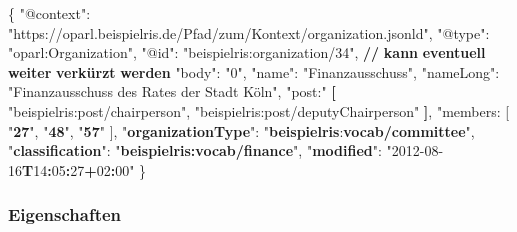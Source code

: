 \documentclass[,a4paper]{article}
\newenvironment{Shaded}{}{}
\newcommand{\DataTypeTok}[1]{\textcolor[rgb]{0.56,0.13,0.00}{{#1}}}
\newcommand{\DecValTok}[1]{\textcolor[rgb]{0.25,0.63,0.44}{{#1}}}
\newcommand{\StringTok}[1]{\textcolor[rgb]{0.25,0.44,0.63}{{#1}}}
\newcommand{\ErrorTok}[1]{\textcolor[rgb]{1.00,0.00,0.00}{\textbf{{#1}}}}
\newcommand{\NormalTok}[1]{{#1}}
\begin{document}
\begin{Shaded}
\begin{Highlighting}[]
\NormalTok{\{}
    \DataTypeTok{"@context"}\NormalTok{: }\StringTok{"https://oparl.beispielris.de/Pfad/zum/Kontext/organization.jsonld"}\NormalTok{,}
    \DataTypeTok{"@type"}\NormalTok{: }\StringTok{"oparl:Organization"}\NormalTok{,}
    \DataTypeTok{"@id"}\NormalTok{: }\StringTok{"beispielris:organization/34"}\NormalTok{,}
      \ErrorTok{//} \ErrorTok{kann} \ErrorTok{eventuell} \ErrorTok{weiter} \ErrorTok{verkürzt} \ErrorTok{werden}
    \DataTypeTok{"body"}\NormalTok{: }\StringTok{"0"}\NormalTok{,}
    \DataTypeTok{"name"}\NormalTok{: }\StringTok{"Finanzausschuss"}\NormalTok{,}
    \DataTypeTok{"nameLong"}\NormalTok{: }\StringTok{"Finanzausschuss des Rates der Stadt Köln"}\NormalTok{,}
    \DataTypeTok{"post:"} \ErrorTok{[}
        \DataTypeTok{"beispielris:post/chairperson"}\NormalTok{,}
        \DataTypeTok{"beispielris:post/deputyChairperson"}
    \ErrorTok{]}\NormalTok{,}
    \DataTypeTok{"members: [}
\DataTypeTok{        "}\ErrorTok{27}\DataTypeTok{",}
\DataTypeTok{        "}\ErrorTok{48}\DataTypeTok{",}
\DataTypeTok{        "}\ErrorTok{57}\DataTypeTok{"}
\DataTypeTok{    ],}
\DataTypeTok{    "}\ErrorTok{organizationType}\DataTypeTok{": "}\ErrorTok{beispielris}\NormalTok{:}\ErrorTok{vocab/committee}\StringTok{",}
\StringTok{    "}\ErrorTok{classification}\StringTok{": "}\ErrorTok{beispielris:vocab/finance}\StringTok{",}
\StringTok{    "}\ErrorTok{modified}\StringTok{": "}\DecValTok{2012-08-16}\ErrorTok{T}\DecValTok{14}\ErrorTok{:}\DecValTok{05}\ErrorTok{:}\DecValTok{27}\ErrorTok{+}\DecValTok{02}\ErrorTok{:}\DecValTok{00}\StringTok{"}
\StringTok{\}}
\end{Highlighting}
\end{Shaded}

\subsubsection{Eigenschaften}\label{eigenschaften-2}
\end{document}
